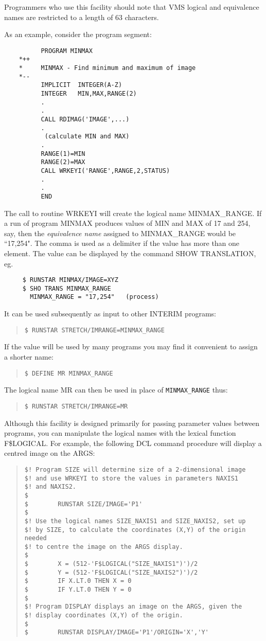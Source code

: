 Programmers who use this facility should note that VMS logical and equivalence
names are restricted to a length of 63 characters.

As an example, consider the program segment:
\begin{verbatim}
          PROGRAM MINMAX
    *++
    *     MINMAX - Find minimum and maximum of image
    *--
          IMPLICIT  INTEGER(A-Z)
          INTEGER   MIN,MAX,RANGE(2)
          .
          .
          CALL RDIMAG('IMAGE',...)
          .
           (calculate MIN and MAX)
          .
          RANGE(1)=MIN
          RANGE(2)=MAX
          CALL WRKEYI('RANGE',RANGE,2,STATUS)
          .
          .
          END
\end{verbatim}
The call to routine WRKEYI will create the logical name MINMAX\_RANGE.
If a run of program MINMAX produces values of MIN and MAX of 17 and 254, say,
then the {\em equivalence name} assigned to MINMAX\_RANGE would be ``17,254".
The comma is used as a delimiter if the value has more than one element.
The value can be displayed by the command SHOW TRANSLATION, eg.
\begin{verbatim}
     $ RUNSTAR MINMAX/IMAGE=XYZ
     $ SHO TRANS MINMAX_RANGE
       MINMAX_RANGE = "17,254"   (process)
\end{verbatim}
It can be used subsequently as input to other INTERIM programs:
\begin{quote}
{\tt \$ RUNSTAR STRETCH/IMRANGE=MINMAX\_RANGE}
\end{quote}
If the value will be used by many programs you may find it convenient to
assign a shorter name:
\begin{quote}
{\tt \$ DEFINE MR MINMAX\_RANGE}
\end{quote}
The logical name MR can then be used in place of {\tt MINMAX\_RANGE} thus:
\begin{quote}
{\tt \$ RUNSTAR STRETCH/IMRANGE=MR}
\end{quote}
Although this facility is designed primarily for passing parameter values
between programs, you can manipulate the logical names with the lexical
function F\$LOGICAL.
For example, the following DCL command procedure will display a centred image
on the ARGS:
\begin{quote}
\begin{verbatim}
$! Program SIZE will determine size of a 2-dimensional image
$! and use WRKEYI to store the values in parameters NAXIS1
$! and NAXIS2.
$
$        RUNSTAR SIZE/IMAGE='P1'
$
$! Use the logical names SIZE_NAXIS1 and SIZE_NAXIS2, set up
$! by SIZE, to calculate the coordinates (X,Y) of the origin needed
$! to centre the image on the ARGS display.
$
$        X = (512-'F$LOGICAL("SIZE_NAXIS1")')/2
$        Y = (512-'F$LOGICAL("SIZE_NAXIS2")')/2
$        IF X.LT.0 THEN X = 0
$        IF Y.LT.0 THEN Y = 0
$
$! Program DISPLAY displays an image on the ARGS, given the
$! display coordinates (X,Y) of the origin.
$
$        RUNSTAR DISPLAY/IMAGE='P1'/ORIGIN='X','Y'
\end{verbatim}
\end{quote}
